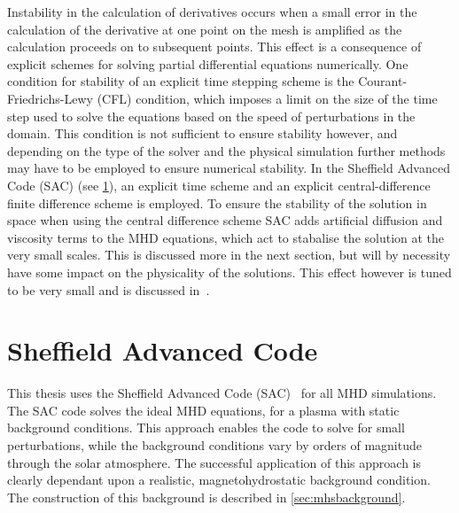 Instability in the calculation of derivatives occurs when a small error in the calculation of the derivative at one point on the mesh is amplified as the calculation proceeds on to subsequent points.
This effect is a consequence of explicit schemes for solving partial differential equations numerically.
One condition for stability of an explicit time stepping scheme is the Courant-Friedrichs-Lewy (CFL) condition, which imposes a limit on the size of the time step used to solve the equations based on the speed of perturbations in the domain.
This condition is not sufficient to ensure stability however, and depending on the type of the solver and the physical simulation further methods may have to be employed to ensure numerical stability.
In the Sheffield Advanced Code (SAC) (see \cref{sec:SAC}), an explicit time scheme and an explicit central-difference finite difference scheme is employed.
To ensure the stability of the solution in space when using the central difference scheme SAC adds artificial diffusion and viscosity terms to the MHD equations, which act to stabalise the solution at the very small scales.
This is discussed more in the next section, but will by necessity have some impact on the physicality of the solutions.
This effect however is tuned to be very small and is discussed in~\citep{shelyag2008}.


\section{Sheffield Advanced Code}\label{sec:SAC}

This thesis uses the Sheffield Advanced Code (SAC)~\citep{shelyag2008} for all MHD simulations.
The SAC code solves the ideal MHD equations, for a plasma with static background conditions.
This approach enables the code to solve for small perturbations, while the background conditions vary by orders of magnitude through the solar atmosphere.
The successful application of this approach is clearly dependant upon a realistic, magnetohydrostatic background condition.
The construction of this background is described in \cref{sec:mhsbackground}.

